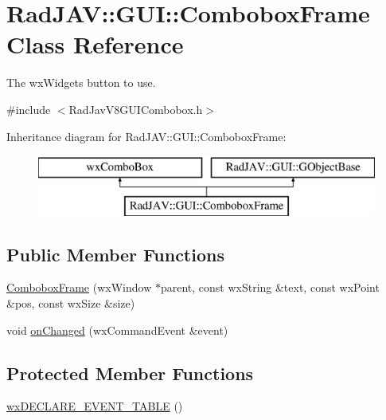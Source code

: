 \hypertarget{class_rad_j_a_v_1_1_g_u_i_1_1_combobox_frame}{}\section{Rad\+J\+AV\+:\+:G\+UI\+:\+:Combobox\+Frame Class Reference}
\label{class_rad_j_a_v_1_1_g_u_i_1_1_combobox_frame}


The wx\+Widgets button to use.  




{\ttfamily \#include $<$Rad\+Jav\+V8\+G\+U\+I\+Combobox.\+h$>$}

Inheritance diagram for Rad\+J\+AV\+:\+:G\+UI\+:\+:Combobox\+Frame\+:\begin{figure}[H]
\begin{center}
\leavevmode
\includegraphics[height=2.000000cm]{class_rad_j_a_v_1_1_g_u_i_1_1_combobox_frame}
\end{center}
\end{figure}
\subsection*{Public Member Functions}
\begin{DoxyCompactItemize}
\item 
\mbox{\hyperlink{class_rad_j_a_v_1_1_g_u_i_1_1_combobox_frame_ad1ab08399b1c9eceffb019190d3baa62}{Combobox\+Frame}} (wx\+Window $\ast$parent, const wx\+String \&text, const wx\+Point \&pos, const wx\+Size \&size)
\item 
void \mbox{\hyperlink{class_rad_j_a_v_1_1_g_u_i_1_1_combobox_frame_a8c969aeaad52dd72c579cd91cff7d896}{on\+Changed}} (wx\+Command\+Event \&event)
\end{DoxyCompactItemize}
\subsection*{Protected Member Functions}
\begin{DoxyCompactItemize}
\item 
\mbox{\hyperlink{class_rad_j_a_v_1_1_g_u_i_1_1_combobox_frame_a984cc0c81a05cf531e443f7e395067c4}{wx\+D\+E\+C\+L\+A\+R\+E\+\_\+\+E\+V\+E\+N\+T\+\_\+\+T\+A\+B\+LE}} ()
\end{DoxyCompactItemize}
